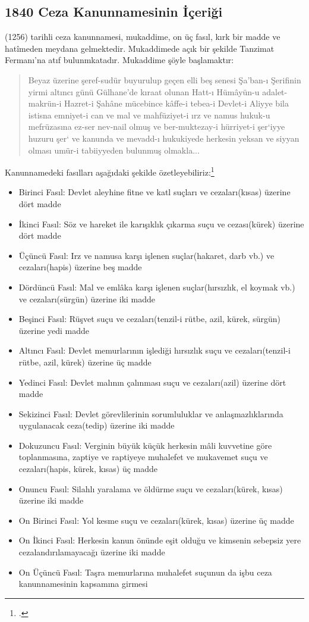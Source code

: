 \subsection{1840 Ceza Kanunnamesinin İçeriği}
\indent{}(1256) tarihli ceza kanunnamesi, mukaddime, on üç fasıl, kırk bir madde ve hatîmeden meydana gelmektedir. Mukaddimede açık bir şekilde Tanzimat Fermanı'na atıf bulunmkatadır. Mukaddime şöyle başlamaktır:
\begin{quote}
Beyaz üzerine şeref-sudür buyurulup geçen elli beş senesi Şa'ban-ı Şerifinin yirmi altıncı günü Gülhane'de kıraat olunan Hatt-ı Hümâyün-u adalet-makrün-i Hazret-i Şahâne mücebince kâffe-i tebea-i Devlet-i Aliyye bila istisna emniyet-i can ve mal ve mahfüziyet-i ırz ve namus hukuk-u mefrüzasına ez-ser nev-nail olmuş ve ber-muktezay-i hürriyet-i şer`iyye huzuru şer` ve kanunda ve mevadd-ı hukukiyede herkesin yeksan ve siyyan olması umür-i tabiiyyeden bulunmuş olmakla... 
\end{quote}

Kanunnamedeki fasılları aşağıdaki şekilde özetleyebiliriz:\footcite[811-818]{islam_osmanli_hukuku}
\begin{itemize}
    \item Birinci Fasıl: Devlet aleyhine fitne ve katl suçları ve cezaları(kısas) üzerine dört madde
    \item İkinci Fasıl: Söz ve hareket ile karışıklık çıkarma suçu ve cezası(kürek) üzerine dört madde
    \item Üçüncü Fasıl: Irz ve namusa karşı işlenen suçlar(hakaret, darb vb.) ve cezaları(hapis) üzerine beş madde
    \item Dördüncü Fasıl: Mal ve emlâka karşı işlenen suçlar(hırsızlık, el koymak vb.) ve cezaları(sürgün) üzerine iki madde
    \item Beşinci Fasıl: Rüşvet suçu ve cezaları(tenzil-i rütbe, azil, kürek, sürgün) üzerine yedi madde
    \item Altıncı Fasıl: Devlet memurlarının işlediği hırsızlık suçu ve cezaları(tenzil-i rütbe, azil, kürek) üzerine üç madde
    \item Yedinci Fasıl: Devlet malının çalınması suçu ve cezaları(azil) üzerine dört madde
    \item Sekizinci Fasıl: Devlet görevlilerinin sorumluluklar ve anlaşmazlıklarında uygulanacak ceza(tedip) üzerine iki madde
    \item Dokuzuncu Fasıl: Verginin büyük küçük herkesin mâli kuvvetine göre toplanmasına, zaptiye ve raptiyeye muhalefet ve mukavemet suçu ve cezaları(hapis, kürek, kısas) üç madde
    \item Onuncu Fasıl: Silahlı yaralama ve öldürme suçu ve cezaları(kürek, kısas) üzerine iki madde
    \item On Birinci Fasıl: Yol kesme suçu ve cezaları(kürek, kısas) üzerine üç madde
    \item On İkinci Fasıl: Herkesin kanun önünde eşit olduğu ve kimsenin sebepsiz yere cezalandırılamayacağı üzerine iki madde
    \item On Üçüncü Fasıl: Taşra memurlarına muhalefet suçunun da işbu ceza kanunnamesinin kapsamına girmesi
\end{itemize}

